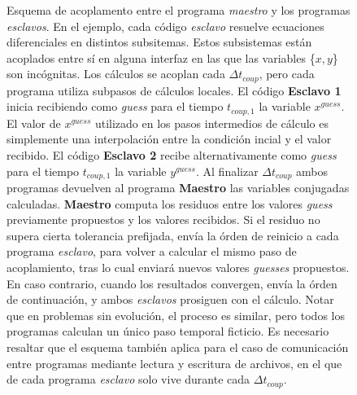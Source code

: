 \begin{figure}
\caption[Esquema de acoplamiento entre programas implementado]{Esquema de acoplamento entre el programa \textit{maestro} y los programas \textit{esclavos}.
En el ejemplo, cada código \textit{esclavo} resuelve ecuaciones diferenciales en distintos subsitemas.
Estos subsistemas están acoplados entre sí en alguna interfaz en las que las variables \{$x,y$\} son incógnitas.
Los cálculos se acoplan cada $\Delta t_{coup}$, pero cada programa utiliza subpasos de cálculos locales.
El código \textbf{Esclavo 1} inicia recibiendo como \textit{guess} para el tiempo $t_{coup,1}$ la variable $x^{guess}$.
El valor de $x^{guess}$ utilizado en los pasos intermedios de cálculo es simplemente una interpolación entre la condición incial y el valor recibido.
El código \textbf{Esclavo 2} recibe alternativamente como \textit{guess} para el tiempo $t_{coup,1}$ la variable $y^{guess}$.
Al finalizar $\Delta t_{coup}$ ambos programas devuelven al programa \textbf{Maestro} las variables conjugadas calculadas.
\textbf{Maestro} computa los residuos entre los valores \textit{guess} previamente propuestos y los valores recibidos.
Si el residuo no supera cierta tolerancia prefijada, envía la órden de reinicio a cada programa \textit{esclavo}, 
para volver a calcular el mismo paso de acoplamiento, tras lo cual enviará nuevos valores \textit{guesses} propuestos.
En caso contrario, cuando los resultados convergen, envía la órden de continuación, y ambos \textit{esclavos} prosiguen con el cálculo.
Notar que en problemas sin evolución, el proceso es similar, pero todos los programas calculan un único paso temporal ficticio.
Es necesario resaltar que el esquema también aplica para el caso de comunicación entre programas mediante lectura y escritura de archivos, en el que de cada programa \textit{esclavo} solo vive durante cada $\Delta t_{coup}$.
}
\label{esquema-evolucion}
\end{figure}

